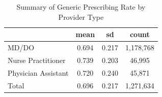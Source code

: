 \begin{table}[htbp]\centering
\def\sym#1{\ifmmode^{#1}\else\(^{#1}\)\fi}
\caption{Summary of Generic Prescribing Rate by Provider Type}
\begin{tabular}{l*{1}{ccc}}
\toprule
                    &        mean&          sd&       count\\
\midrule
MD/DO               &       0.694&       0.217&   1,178,768\\
Nurse Practitioner  &       0.739&       0.203&      46,995\\
Physician Assistant &       0.720&       0.240&      45,871\\
Total               &       0.696&       0.217&   1,271,634\\
\bottomrule
\end{tabular}
\end{table}
